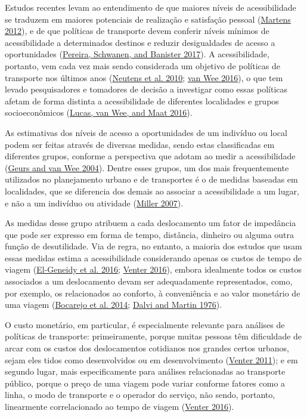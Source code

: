 \documentclass[msc,numbers]{coppe}
\begin{document}
  Estudos recentes levam ao entendimento de que maiores níveis de acessibilidade se traduzem em maiores potenciais de realização e satisfação pessoal (\protect\hyperlink{ref-martens2012justice}{Martens 2012}), e de que políticas de transporte devem conferir níveis mínimos de acessibilidade a determinados destinos e reduzir desigualdades de acesso a oportunidades (\protect\hyperlink{ref-pereira2017distributive}{Pereira, Schwanen, and Banister 2017}). A acessibilidade, portanto, vem cada vez mais sendo considerada um objetivo de políticas de transporte nos últimos anos (\protect\hyperlink{ref-neutens2010equity}{Neutens et al. 2010}; \protect\hyperlink{ref-vanwee2016accessible}{van Wee 2016}), o que tem levado pesquisadores e tomadores de decisão a investigar como essas políticas afetam de forma distinta a acessibilidade de diferentes localidades e grupos socioeconômicos (\protect\hyperlink{ref-lucas2016method}{Lucas, van Wee, and Maat 2016}).

  As estimativas dos níveis de acesso a oportunidades de um indivíduo ou local podem ser feitas através de diversas medidas, sendo estas classificadas em diferentes grupos, conforme a perspectiva que adotam ao medir a acessibilidade (\protect\hyperlink{ref-geurs2004accessibility}{Geurs and van Wee 2004}). Dentre esses grupos, um dos mais frequentemente utilizados no planejamento urbano e de transportes é o de medidas baseadas em localidades, que se diferencia dos demais ao associar a acessibilidade a um lugar, e não a um indivíduo ou atividade (\protect\hyperlink{ref-miller2007placebased}{Miller 2007}).

  As medidas desse grupo atribuem a cada deslocamento um fator de impedância que pode ser expresso em forma de tempo, distância, dinheiro ou alguma outra função de desutilidade. Via de regra, no entanto, a maioria dos estudos que usam essas medidas estima a acessibilidade considerando apenas os custos de tempo de viagem (\protect\hyperlink{ref-el-geneidy2016cost}{El-Geneidy et al. 2016}; \protect\hyperlink{ref-venter2016assessing}{Venter 2016}), embora idealmente todos os custos associados a um deslocamento devam ser adequadamente representados, como, por exemplo, os relacionados ao conforto, à conveniência e ao valor monetário de uma viagem (\protect\hyperlink{ref-bocarejo2014innovative}{Bocarejo et al. 2014}; \protect\hyperlink{ref-dalvi1976measurement}{Dalvi and Martin 1976}).

  O custo monetário, em particular, é especialmente relevante para análises de políticas de transporte: primeiramente, porque muitas pessoas têm dificuldade de arcar com os custos dos deslocamentos cotidianos nos grandes certos urbanos, sejam eles tidos como desenvolvidos ou em desenvolvimento (\protect\hyperlink{ref-venter2011transport}{Venter 2011}); e em segundo lugar, mais especificamente para análises relacionadas ao transporte público, porque o preço de uma viagem pode variar conforme fatores como a linha, o modo de transporte e o operador do serviço, não sendo, portanto, linearmente correlacionado ao tempo de viagem (\protect\hyperlink{ref-venter2016assessing}{Venter 2016}).
\end{document}
